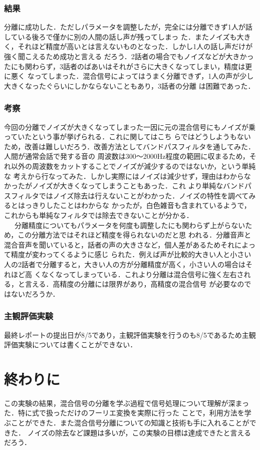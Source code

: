 \documentclass[a4j]{jarticle}
\begin{document}
\subsubsection*{結果}
分離に成功した．ただしパラメータを調整したが，完全には分離できず1人が話している後ろで僅かに別の人間の話し声が残ってしまっ
た．またノイズも大きく，それほど精度が高いとは言えないものとなった．しかし1人の話し声だけが強く聞こえるため成功と言える
だろう．2話者の場合でもノイズなどが大きかったにも関わらず，3話者のばあいはそれがさらに大きくなってしまい，精度は更に悪く
なってしまった．混合信号によってはうまく分離できず，1人の声が少し大きくなったぐらいにしかならないこともあり，3話者の分離
は困難であった．
\subsubsection*{考察}
今回の分離でノイズが大きくなってしまった一因に元の混合信号にもノイズが乗っていたという事が挙げられる．これに関してはこち
らではどうしようもないため，改善は難しいだろう．改善方法としてバンドパスフィルタを通してみた．人間が通常会話で発する音の
周波数は300〜2000Hz程度の範囲に収まるため，それ以外の周波数をカットすることでノイズが減少するのではないか，という単純な
考えから行なってみた．しかし実際にはノイズは減少せず，理由はわからなかったがノイズが大きくなってしまうこともあった．これ
より単純なバンドパスフィルタではノイズ除去は行えないことがわかった．ノイズの特性を調べてみるとはっきりしたことはわからな
かったが，白色雑音も含まれているようで，これからも単純なフィルタでは除去できないことが分かる．\\\ \ \ 
分離精度についてもパラメータを何度も調整したにも関わらず上がらないため，この分離方法ではそれほど精度を得られないのだと思
われる．分離音声と混合音声を聞いていると，話者の声の大きさなど，個人差があるためそれによって精度が変わってくるように感じ
られた．例えば声が比較的大きい人と小さい人の2話者で分離すると，大きい人の方が分離精度が高く，小さい人の場合はそれほど高
くなくなってしまっている．これより分離は混合信号に強く左右される，と言える．高精度の分離には限界があり，高精度の混合信号
が必要なのではないだろうか．
\subsubsection*{主観評価実験}
最終レポートの提出日が8/5であり，主観評価実験を行うのも8/5であるため主観評価実験については書くことができない．

\section*{終わりに}
この実験の結果，混合信号の分離を学ぶ過程で信号処理について理解が深まった．特に式で扱っただけのフーリエ変換を実際に行った
ことで，利用方法を学ぶことができた．また混合信号分離についての知識と技術も手に入れることができた．
ノイズの除去など課題は多いが，この実験の目標は達成できたと言えるだろう．
\end{document}
